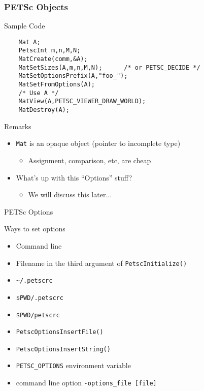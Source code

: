 

\begin{frame}[fragile]
\frametitle{PETSc Objects}
\begin{block}{Sample Code}
  \begin{lstlisting}
    Mat A;
    PetscInt m,n,M,N;
    MatCreate(comm,&A);
    MatSetSizes(A,m,n,M,N);      /* or PETSC_DECIDE */ 
    MatSetOptionsPrefix(A,"foo_");
    MatSetFromOptions(A);
    /* Use A */
    MatView(A,PETSC_VIEWER_DRAW_WORLD);
    MatDestroy(A);
  \end{lstlisting}
  \end{block}
  
  \begin{block}{Remarks}
  \begin{itemize}
  \item \lstinline|Mat| is an opaque object (pointer to incomplete type)
    \begin{itemize}
     \item Assignment, comparison, etc, are cheap
    \end{itemize}
  \item What's up with this ``Options'' stuff?
    \begin{itemize}
    \item We will discuss this later...
    \end{itemize}
  \end{itemize}
  
\end{block}
\end{frame}



\begin{frame}[fragile]{PETSc Options}
\begin{block}{Ways to set options}
  \begin{itemize}
  \item Command line
  \item Filename in the third argument of \lstinline|PetscInitialize()|
  \item \lstinline|~/.petscrc|
  \item \lstinline|$PWD/.petscrc|
  \item \lstinline|$PWD/petscrc|
  \item \lstinline|PetscOptionsInsertFile()|
  \item \lstinline|PetscOptionsInsertString()|
  \item \lstinline|PETSC_OPTIONS| environment variable
  \item command line option \lstinline|-options_file [file]|
  \end{itemize}
\end{block}
\end{frame}


